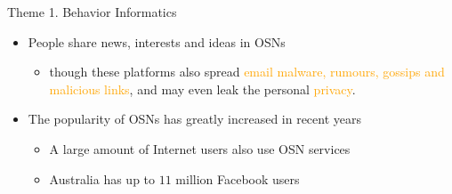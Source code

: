 \begin{slide}{Theme 1. Behavior Informatics}
\begin{itemize}
\item
People share \textcolor{blue!50}{news, interests}
and \textcolor{blue!50}{ideas} in OSNs

\begin{itemize}
\item
though these platforms also spread
\textcolor{orange}{email malware, rumours, gossips}
\textcolor{orange}{and malicious links},
and may even leak the personal \textcolor{orange}{privacy}.
\end{itemize}

\item The popularity of OSNs has greatly increased in recent years

\begin{itemize}
\item
A large amount of Internet users also use OSN services

\item
Australia has up to $11$ million Facebook users
\end{itemize}


\end{itemize}
%
%
\end{slide}


